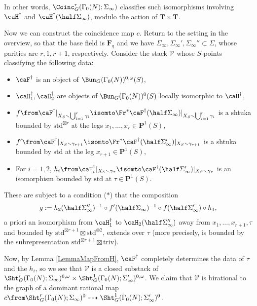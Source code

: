 \documentclass{article}
\def\F{\mathbf{F}}
\def\P{\mathbf{P}}
\begin{document}
In other words, $\Coinc^{r}_G(\Gamma_0(N);\Sigma_\infty)$ classifies such isomorphisms involving $\caH^\dagger$ and $\caH^\dagger(\half \Sigma_\infty)$, modulo the action of $\mathbf{T}\times\mathbf{T}$.

Now we can construct the coincidence map $c$.  Return to the setting in the overview, so that the base field is $\F_q$ and we have $\Sigma_\infty,\Sigma_\infty',\Sigma_\infty''\subset \Sigma$, whose parities are $r,1,r+1$, respectively.  Consider the stack $\mathcal{V}$ whose $S$-points classifying the following data:
\begin{itemize}
\item $\caF^\dagger$ is an object of $\Bun_G(\Gamma_0(N))^{0,\omega}(S)$,
\item $\caH_1^\dagger,\caH_2^\dagger$ are objects of $\Bun_G(\Gamma_0(N))^0(S)$ locally isomorphic to $\caH^\dagger$,
\item $f\from \caF^\dagger\vert_{X_S\smallsetminus \bigcup_{i=1}^r \gamma_i } \isomto \Fr^\ast\caF^\dagger(\half \Sigma_\infty)\vert_{X_S\smallsetminus \bigcup_{i=1}^r \gamma_i}$ is a shtuka bounded by $\mathrm{std}^{\boxtimes r}$ at the legs $x_1,\dots,x_r\in\P^1(S)$,
\item $f'\from \caF^\dagger\vert_{X_S\smallsetminus \gamma_{r+1}}\isomto \Fr^\ast\caF^\dagger(\half \Sigma_\infty')\vert_{X_S\smallsetminus \gamma_{r+1}}$ is a shtuka bounded by $\mathrm{std}$ at the leg $x_{r+1}\in\P^1(S)$,
\item For $i=1,2$, $h_i\from \caH_i^{\dagger}\vert_{X_S\smallsetminus \gamma_\tau} \isomto \caF^\dagger(\half \Sigma_\infty')\vert_{X_S\smallsetminus \gamma_\tau} $ is an isomorphism bounded by $\mathrm{std}$ at $\tau\in\P^1(S)$.
\end{itemize}
These are subject to a condition ($\ast$) that the composition 
\begin{equation}
\label{EqFormulaForG}
 g:=h_2(\half \Sigma_\infty'')^{-1}\circ f'(\half \Sigma_\infty)^{-1}\circ f(\half \Sigma_\infty') \circ h_1,
\end{equation}
a priori an isomorphism from $\caH_1^\dagger$ to $\caH_2(\half \Sigma_\infty'')$ away from $x_1,\dots,x_{r+1},\tau$ and bounded by $\mathrm{std}^{\boxtimes r+1} \boxtimes \mathrm{std}^{\otimes 2}$, extends over $\tau$ (more precisely, is bounded by the subrepresentation $\mathrm{std}^{\boxtimes r+1} \boxtimes \mathrm{triv}$).  

Now, by Lemma \ref{LemmaMapFromH}, $\caF^\dagger$ completely determines the data of $\tau$ and the $h_i$, so we see that $\mathcal{V}$ is a closed substack of $\Sht_G^r(\Gamma_0(N);\Sigma_\infty)^{0,\omega}\times \Sht_G^1(\Gamma_0(N);\Sigma_\infty')^{0,\omega}$.  We claim that $\mathcal{V}$ is birational to the graph of a dominant rational map $c\from \Sht_G^r(\Gamma_0(N);\Sigma_\infty)^0\dashrightarrow\Sht_G^1(\Gamma_0(N);\Sigma_\infty')^0$.
\end{document}
